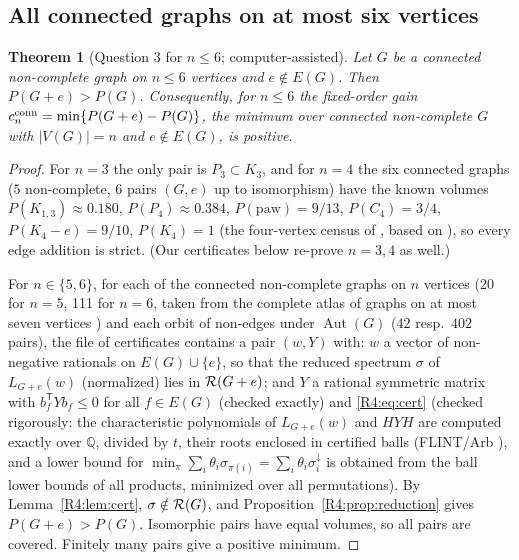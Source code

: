 \documentclass[11pt]{amsart}
\newtheorem{theorem}{Theorem}[section]
\theoremstyle{definition}
\theoremstyle{remark}
\begin{document}
\subsection{All connected graphs on at most six vertices}
\label{R4:subsec:small}

\begin{theorem}[Question 3 for $n\le6$; computer-assisted]\label{R4:thm:small}
Let $G$ be a connected non-complete graph on $n\le6$ vertices and
$e\notin E(G)$.  Then $P(G+e)>P(G)$.  Consequently, for $n\le 6$ the
fixed-order gain $c^{\rm conn}_n=\min\{P(G+e)-P(G)\}$, the minimum over
connected non-complete $G$ with $|V(G)|=n$ and $e\notin E(G)$, is
positive.
\end{theorem}

\begin{proof}
For $n=3$ the only pair is $P_3\subset K_3$, and for $n=4$ the six
connected graphs ($5$ non-complete, $6$ pairs $(G,e)$ up to isomorphism)
have the known volumes
$P(K_{1,3})\approx0.180$, $P(P_4)\approx0.384$, $P(\mathrm{paw})=9/13$,
$P(C_4)=3/4$, $P(K_4-e)=9/10$, $P(K_4)=1$
(the four-vertex census of \cite{K-015}, based on \cite{R4-EJT,R4-FGL}), so every edge
addition is strict.  (Our certificates below re-prove $n=3,4$ as well.)

For $n\in\{5,6\}$, for each of the connected non-complete graphs on $n$
vertices (20 for $n=5$, 111 for $n=6$, taken from the complete atlas of
graphs on at most seven vertices \cite{R4-Atlas}) and each orbit of
non-edges under $\operatorname{Aut}(G)$ ($42$ resp.\ $402$ pairs), the
file of certificates contains a pair $(w,Y)$
with: $w$ a vector of non-negative rationals on $E(G)\cup\{e\}$, so that
the reduced spectrum $\sigma$ of $L_{G+e}(w)$ (normalized) lies in
$\mathcal{R}(G+e)$; and $Y$ a rational symmetric matrix with
$b_f^{\mathsf T}Yb_f\le0$ for all $f\in E(G)$ (checked exactly) and
\eqref{R4:eq:cert} (checked rigorously: the characteristic polynomials of
$L_{G+e}(w)$ and $HYH$ are computed exactly over $\mathbb Q$, divided by
$t$, their roots enclosed in certified balls (FLINT/Arb
\cite{R4-Arb}), and a lower bound
for $\min_\pi\sum_i\theta_i\sigma_{\pi(i)}=\sum_i\theta_i\sigma_i^\downarrow$ is
obtained from the ball lower bounds of all products, minimized over all
permutations).  By Lemma~\ref{R4:lem:cert}, $\sigma\notin\mathcal{R}(G)$, and
Proposition~\ref{R4:prop:reduction} gives $P(G+e)>P(G)$.  Isomorphic
pairs have equal volumes, so all pairs are covered.  Finitely many pairs
give a positive minimum.
\end{proof}
\end{document}
